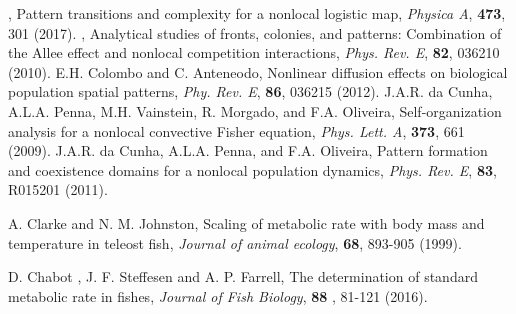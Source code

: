 \begin{thebibliography}{100}
{%
%
%
%

, {Pattern transitions and complexity for a nonlocal logistic map}, \textit{Physica A}, \textbf{473}, {301} {(2017)}.
%
%
, {Analytical studies of fronts, colonies, and patterns: Combination of the Allee effect and nonlocal competition interactions}, \textit{Phys. Rev. E}, \textbf{82}, {036210} {(2010)}.
%
%
 {E.H. Colombo and C. Anteneodo}, {Nonlinear diffusion effects on biological population spatial patterns},  \textit{Phy. Rev. E}, \textbf{86}, 036215 (2012). 
%
%
 {J.A.R. da Cunha, A.L.A. Penna, M.H. Vainstein, R. Morgado, and F.A. Oliveira}, {Self-organization analysis for a nonlocal convective Fisher equation}, \textit{Phys. Lett. A}, \textbf{373}, 661 {(2009)}.
%
%
 {J.A.R. da Cunha, A.L.A. Penna, and F.A. Oliveira}, {Pattern formation and coexistence domains for a nonlocal population dynamics}, \textit{Phys. Rev. E}, \textbf{83}, {R015201} {(2011)}.

 { A. Clarke and  N. M. Johnston}, {Scaling of metabolic rate with body mass and temperature in teleost fish}, \textit{Journal of animal ecology}, \textbf{68},  893-905 (1999).}

 {D. Chabot , J. F. Steffesen and A. P. Farrell}, {The determination of standard metabolic rate in fishes}, \textit{Journal of Fish Biology}, \textbf{88} , 81-121 (2016).

\end{thebibliography}




